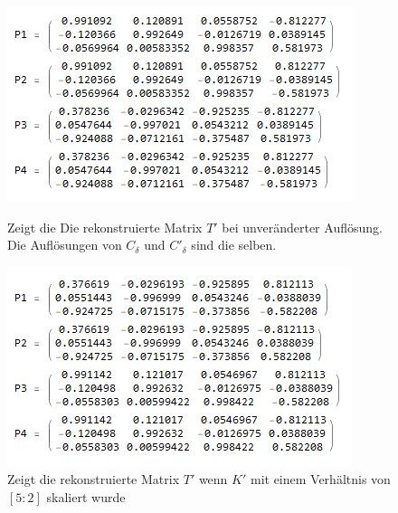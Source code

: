 \begin{figure}[!htb]
	\includegraphics[width=\linewidth]{images/R_11.png}
	\caption{Zeigt die Die rekonstruierte Matrix $T'$ bei unveränderter Auflösung. Die Auflösungen von $C_\delta$ und $C'_\delta$ sind die selben.}
	\label{fig:T11}
	\endminipage\hfill
	\includegraphics[width=\linewidth]{images/R_52.png}
	\caption{Zeigt die rekonstruierte Matrix $T'$ wenn $K'$ mit einem Verhältnis von $[5:2]$ skaliert wurde}
	\label{fig:T52}
	\endminipage\hfill
\end{figure}
